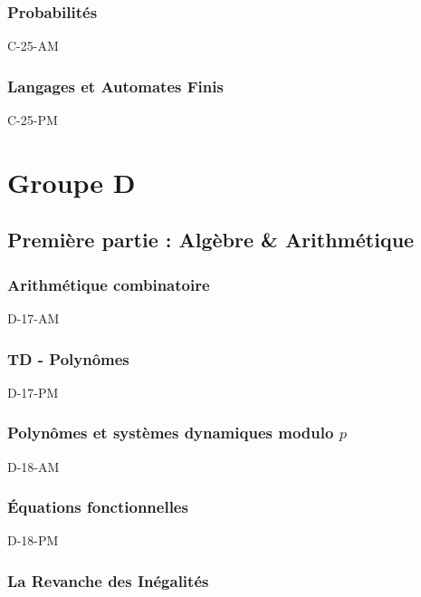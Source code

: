 \documentclass[poly,trombi]{valbonne}
\begin{document}
\subsection{Probabilités}

{C-25-AM}

\subsection{Langages et Automates Finis}

{C-25-PM}






\chapter{Groupe D}

\minitoc \clearpage

\section{Première partie : Algèbre \& Arithmétique}

\subsection{Arithmétique combinatoire}

{D-17-AM}

\subsection{TD - Polynômes}

{D-17-PM}

\subsection{Polynômes et systèmes dynamiques modulo $p$}

{D-18-AM}

\subsection{Équations fonctionnelles}

{D-18-PM}

\subsection{La Revanche des Inégalités}
\end{document}
